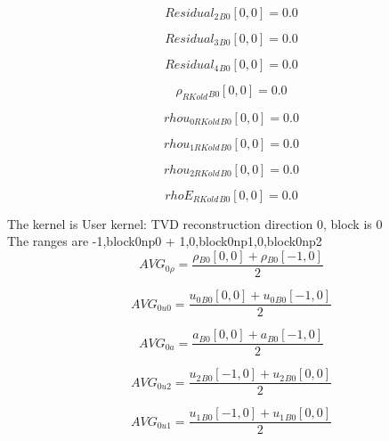 \documentclass{article}
\begin{document}
\begin{dmath}{Residual_{2}{_{B0}}}[{0,0}] = 0.0\end{dmath}

\begin{dmath}{Residual_{3}{_{B0}}}[{0,0}] = 0.0\end{dmath}

\begin{dmath}{Residual_{4}{_{B0}}}[{0,0}] = 0.0\end{dmath}

\begin{dmath}{\rho_{RKold}{_{B0}}}[{0,0}] = 0.0\end{dmath}

\begin{dmath}{rhou_{0 RKold}{_{B0}}}[{0,0}] = 0.0\end{dmath}

\begin{dmath}{rhou_{1 RKold}{_{B0}}}[{0,0}] = 0.0\end{dmath}

\begin{dmath}{rhou_{2 RKold}{_{B0}}}[{0,0}] = 0.0\end{dmath}

\begin{dmath}{rhoE_{RKold}{_{B0}}}[{0,0}] = 0.0\end{dmath}

\noindent The kernel is User kernel: TVD reconstruction direction 0, block is 0\\\noindent The ranges are -1,block0np0 + 1,0,block0np1,0,block0np2\\\begin{dmath}AVG_{0 \rho} = \frac{{\rho{_{B0}}}[{0,0}] + {\rho{_{B0}}}[{-1,0}]}{2}\end{dmath}

\begin{dmath}AVG_{0 u0} = \frac{{u_{0}{_{B0}}}[{0,0}] + {u_{0}{_{B0}}}[{-1,0}]}{2}\end{dmath}

\begin{dmath}AVG_{0 a} = \frac{{a{_{B0}}}[{0,0}] + {a{_{B0}}}[{-1,0}]}{2}\end{dmath}

\begin{dmath}AVG_{0 u2} = \frac{{u_{2}{_{B0}}}[{-1,0}] + {u_{2}{_{B0}}}[{0,0}]}{2}\end{dmath}

\begin{dmath}AVG_{0 u1} = \frac{{u_{1}{_{B0}}}[{-1,0}] + {u_{1}{_{B0}}}[{0,0}]}{2}\end{dmath}
\end{document}
